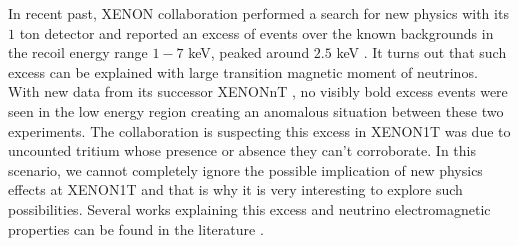 \documentclass[aps, a4paper,superscriptaddress,12pt,preprintnumbers,floatfix,nofootinbib,amsmath,amssymb]{revtex4}
\begin{document}
In recent past, XENON collaboration performed a search for new physics with its $1$ ton detector and reported an excess of events over the known backgrounds in the recoil energy range $1-7$ keV, peaked around $2.5$ keV \cite{XENON:2020rca}. It turns out that such excess can be explained with large transition magnetic moment of neutrinos. With new data from its successor XENONnT \cite{XENON:2022ltv}, no visibly bold excess events were seen in the low energy region creating an anomalous situation between these two experiments. The collaboration is suspecting this excess in XENON1T was due to uncounted tritium whose presence or absence they can't corroborate. In this scenario, we cannot completely ignore the  possible implication of new physics effects at XENON1T and that is why it is very interesting to explore such possibilities. Several works explaining this excess and neutrino electromagnetic properties can be found in the literature \cite{Miranda:2020kwy, Li:2022bqr, Miranda:2021kre, Babu:2021jnu, Brdar:2020quo, Khan:2022bel, Khan:2022akj, Jeong:2021ivd,Alok:2022pdn,Dror:2020czw} .  

\end{document}
